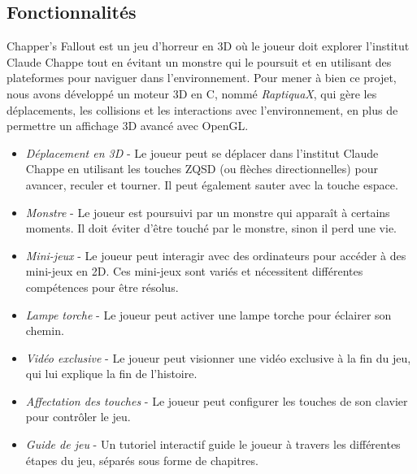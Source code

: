 \newpage
\subsection{Fonctionnalités}

Chapper's Fallout est un jeu d’horreur en 3D où le joueur doit explorer l’institut
Claude Chappe tout en évitant un monstre qui le poursuit et en utilisant des
plateformes pour naviguer dans l’environnement. Pour mener à bien ce projet,
nous avons développé un moteur 3D en C, nommé \textit{RaptiquaX}, qui gère les
déplacements, les collisions et les interactions avec l’environnement, en plus
de permettre un affichage 3D avancé avec OpenGL.\\

\begin{itemize}
    \item \emph{Déplacement en 3D} - Le joueur peut se déplacer dans l’institut Claude
    Chappe en utilisant les touches ZQSD (ou flèches directionnelles) pour avancer,
    reculer et tourner. Il peut également sauter avec la touche espace.\\

    \item \emph{Monstre} - Le joueur est poursuivi par un monstre qui apparaît à certains
    moments. Il doit éviter d'être touché par le monstre, sinon il perd une vie.\\

    \item \emph{Mini-jeux} - Le joueur peut interagir avec des ordinateurs pour accéder
    à des mini-jeux en 2D. Ces mini-jeux sont variés et nécessitent différentes
    compétences pour être résolus.\\

    \item \emph{Lampe torche} - Le joueur peut activer une lampe torche pour
    éclairer son chemin. \\

    \item \emph{Vidéo exclusive} - Le joueur peut visionner une vidéo exclusive à la fin
    du jeu, qui lui explique la
    fin de l’histoire.\\

    \item \emph{Affectation des touches} - Le joueur peut configurer les touches de son
    clavier pour contrôler le jeu.\\

    \item \emph{Guide de jeu} - Un tutoriel interactif guide le joueur à travers les
    différentes étapes du jeu, séparés sous forme de chapitres.\\
\end{itemize}
\newpage